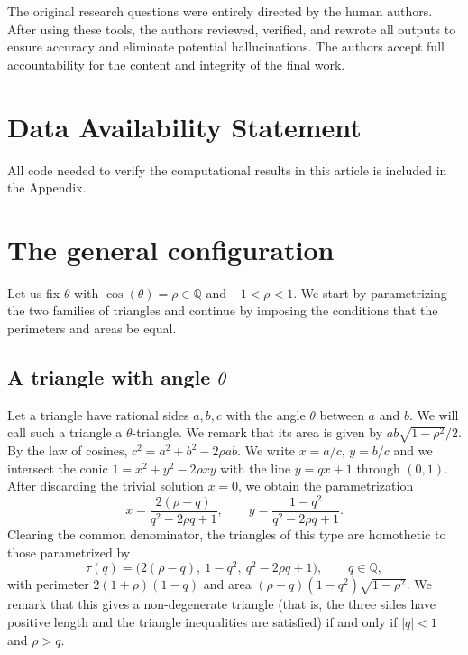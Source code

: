 \documentclass[11pt]{amsart}
\theoremstyle{plain}
\theoremstyle{remark}
\theoremstyle{plain}
\newcommand{\Q}{\mathbb{Q}}
\begin{document}
The original research questions were entirely directed by the human authors. After using these tools, the authors reviewed, verified, and rewrote all outputs to ensure accuracy and eliminate potential hallucinations. The authors accept full accountability for the content and integrity of the final work.

\section*{Data Availability Statement}


All code needed to verify the computational results in this article
is included in the Appendix.




\section{The general configuration}
\label{sec:general-case}

Let us fix $\theta$ with $\cos(\theta)=\rho\in\Q$ and $-1<\rho<1$. We start by parametrizing the two
families of triangles and continue by imposing the conditions that the perimeters
and areas be equal.

\subsection{A triangle with angle \texorpdfstring{$\theta$}{theta}}
Let a triangle have rational sides $a,b,c$ with the angle $\theta$ between $a$ and
$b$. We will call such a triangle a $\theta$-triangle. We remark that its area is given by $ab\sqrt{1-\rho^2}/2$. By the law of cosines, $c^{2}=a^{2}+b^{2}-2\rho ab$. We write
$x=a/c$, $y=b/c$ and we  intersect the conic $1=x^{2}+y^{2}-2\rho xy$ with the line
$y=qx+1$ through $(0,1)$. After discarding the trivial solution $x=0$, we obtain the parametrization
\[
  x=\frac{2(\rho-q)}{q^{2}-2\rho q+1},\qquad
  y=\frac{1-q^{2}}{q^{2}-2\rho q+1}.
\]
Clearing the common denominator, the triangles of this type are homothetic to those parametrized by
\[
  \tau(q)=\bigl(2(\rho-q),\ 1-q^{2},\ q^{2}-2\rho q+1\bigr),\qquad q\in\Q,
\]
with perimeter $2(1+\rho)(1-q)$ and area $(\rho-q)(1-q^{2})\sqrt{1-\rho^{2}}$.
We remark that this gives a non-degenerate triangle (that is, the three sides have positive length and the triangle inequalities are satisfied) if and only if $|q|<1$ and $\rho>q$.
\end{document}
